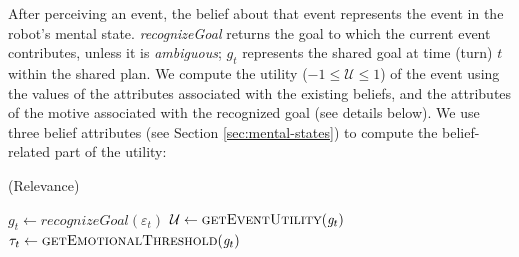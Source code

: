 \documentclass[12pt]{report}
\begin{document}
After perceiving an event, the belief about that event represents the event in
the robot's mental state. \textit{recognizeGoal} returns the goal to which the
current event contributes, unless it is \textit{ambiguous}; $g_{t}$ represents
the shared goal at time (turn) $t$ within the shared plan. We compute the
utility ($-1 \leq \mathcal{U} \leq 1$) of the event using the values of the
attributes associated with the existing beliefs, and the attributes of the
motive associated with the recognized goal (see details below). We use three
belief attributes (see Section \ref{sec:mental-states}) to compute the
belief-related part of the utility:

\begin{algorithm}
	\caption{(Relevance)}
	\label{alg:relevance}
	\begin{algorithmic}[1]
 			\Statex
			\State $\mathit{g}_{t} \gets \textit{recognizeGoal}{(\varepsilon_t)}$
 			\Statex
			\State $\mathcal{U} \gets \Call{getEventUtility}{\mathit{g}_{t}}$ 
			\State $\tau_{t} \gets \Call{getEmotionalThreshold}{\mathit{g}_{t}}$
 			\Statex
 				\State {}
			\Else 
 				\State {}
			\EndIf
		\EndFunction
	\end{algorithmic}
\end{algorithm}
\end{document}
